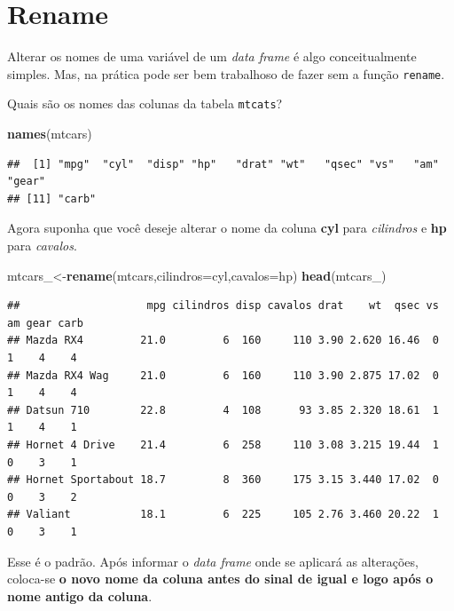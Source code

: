 \documentclass[
]{book}
\newenvironment{Shaded}{\begin{snugshade}}{\end{snugshade}}
\newcommand{\DataTypeTok}[1]{\textcolor[rgb]{0.13,0.29,0.53}{#1}}
\newcommand{\KeywordTok}[1]{\textcolor[rgb]{0.13,0.29,0.53}{\textbf{#1}}}
\newcommand{\NormalTok}[1]{#1}
\begin{document}
\hypertarget{rename}{%
\section{Rename}\label{rename}}

Alterar os nomes de uma variável de um \emph{data frame} é algo
conceitualmente simples. Mas, na prática pode ser bem trabalhoso de
fazer sem a função \texttt{rename}.

Quais são os nomes das colunas da tabela \texttt{mtcats}?

\begin{Shaded}
\begin{Highlighting}[]
\KeywordTok{names}\NormalTok{(mtcars)}
\end{Highlighting}
\end{Shaded}

\begin{verbatim}
##  [1] "mpg"  "cyl"  "disp" "hp"   "drat" "wt"   "qsec" "vs"   "am"   "gear"
## [11] "carb"
\end{verbatim}

Agora suponha que você deseje alterar o nome da coluna \textbf{cyl} para
\emph{cilindros} e \textbf{hp} para \emph{cavalos}.

\begin{Shaded}
\begin{Highlighting}[]
\NormalTok{mtcars_<-}\KeywordTok{rename}\NormalTok{(mtcars,}\DataTypeTok{cilindros=}\NormalTok{cyl,}\DataTypeTok{cavalos=}\NormalTok{hp)}
\KeywordTok{head}\NormalTok{(mtcars_)}
\end{Highlighting}
\end{Shaded}

\begin{verbatim}
##                    mpg cilindros disp cavalos drat    wt  qsec vs am gear carb
## Mazda RX4         21.0         6  160     110 3.90 2.620 16.46  0  1    4    4
## Mazda RX4 Wag     21.0         6  160     110 3.90 2.875 17.02  0  1    4    4
## Datsun 710        22.8         4  108      93 3.85 2.320 18.61  1  1    4    1
## Hornet 4 Drive    21.4         6  258     110 3.08 3.215 19.44  1  0    3    1
## Hornet Sportabout 18.7         8  360     175 3.15 3.440 17.02  0  0    3    2
## Valiant           18.1         6  225     105 2.76 3.460 20.22  1  0    3    1
\end{verbatim}

Esse é o padrão. Após informar o \emph{data frame} onde se aplicará as
alterações, coloca-se \textbf{o novo nome da coluna antes do sinal de
igual e logo após o nome antigo da coluna}.
\end{document}
